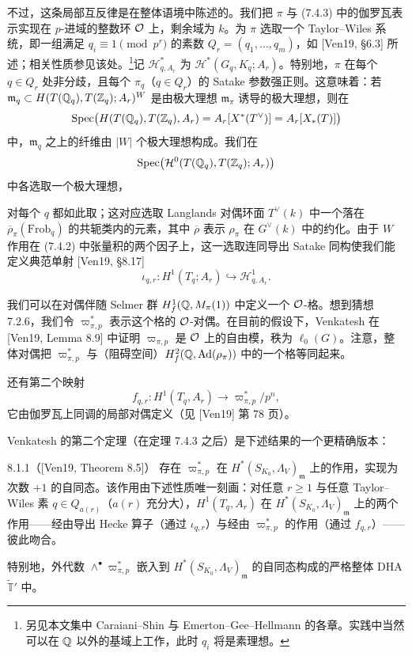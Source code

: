 不过，这条局部互反律是在整体语境中陈述的。我们把 $\pi$ 与 (7.4.3) 中的伽罗瓦表示实现在 $p$-进域的整数环 $\mathcal{O}$ 上，剩余域为 $k$。为 $\pi$ 选取一个 Taylor--Wiles 系统，即一组满足 $q_i\equiv1\pmod{p^r}$ 的素数 $Q_r=(q_1,\dots,q_m)$，如 [Ven19, §6.3] 所述；相关性质参见该处。\footnote{另见本文集中 Caraiani--Shin 与 Emerton--Gee--Hellmann 的各章。实践中当然可以在 $\mathbb{Q}$ 以外的基域上工作，此时 $q_i$ 将是素理想。}记 $\mathcal H^*_{q,A_r}$ 为 $\mathcal H^*(G_q,K_q;A_r)$。特别地，$\pi$ 在每个 $q\in Q_r$ 处非分歧，且每个 $\pi_q$（$q\in Q_r$）的 Satake 参数强正则。这意味着：若 $\mathfrak m_q\subset H(T(\mathbb{Q}_q),T(\mathbb{Z}_q);A_r)^W$ 是由极大理想 $\mathfrak m_\pi$ 诱导的极大理想，则在
\[
\operatorname{Spec}\bigl(H(T(\mathbb{Q}_q),T(\mathbb{Z}_q),A_r)=A_r[X^*(T^\vee)]=A_r[X_*(T)]\bigr)
\]
中，$\mathfrak m_q$ 之上的纤维由 $|W|$ 个极大理想构成。我们在
\[
\operatorname{Spec}\bigl(\mathcal H^0(T(\mathbb{Q}_q),T(\mathbb{Z}_q);A_r)\bigr)
\]
中各选取一个极大理想，

对每个 $q$ 都如此取；这对应选取 Langlands 对偶环面 $T^\vee(k)$ 中一个落在 $\overline{\rho}_\pi(\mathrm{Frob}_q)$ 的共轭类内的元素，其中 $\overline{\rho}$ 表示 $\rho_\pi$ 在 $G^\vee(k)$ 中的约化。由于 $W$ 作用在 (7.4.2) 中张量积的两个因子上，这一选取连同导出 Satake 同构使我们能定义典范单射 [Ven19, §8.17]
\begin{equation}\tag{8.1.1}\label{eq:a6-05-7}
\iota_{q,r}:H^1(T_q;A_r)\hookrightarrow\mathcal H^1_{q,A_r}.
\end{equation}

我们可以在对偶伴随 Selmer 群 $H^1_f(\mathbb{Q},M_\pi(1))$ 中定义一个 $\mathcal{O}$-格。想到猜想 7.2.6，我们令 $\varpi^*_{\pi,p}$ 表示这个格的 $\mathcal{O}$-对偶。在目前的假设下，Venkatesh 在 [Ven19, Lemma 8.9] 中证明 $\varpi_{\pi,p}$ 是 $\mathcal{O}$ 上的自由模，秩为 $\ell_0(G)$。注意，整体对偶把 $\varpi^*_{\pi,p}$ 与（阻碍空间）$H^2_f(\mathbb{Q},\mathrm{Ad}(\rho_\pi))$ 中的一个格等同起来。

还有第二个映射
\begin{equation}\tag{8.1.2}\label{eq:a6-05-8}
f_{q,r}:H^1(T_q,A_r)\to\varpi^*_{\pi,p}/p^n,
\end{equation}
它由伽罗瓦上同调的局部对偶定义（见 [Ven19] 第 78 页）。

Venkatesh 的第二个定理（在定理 7.4.3 之后）是下述结果的一个更精确版本：

\begin{thm}{8.1.1}（[Ven19, Theorem 8.5]）\label{thm:a6-05-9}
存在 $\varpi^*_{\pi,p}$ 在 $H^*(S_{K_0},\Lambda_V)_{\mathfrak m}$ 上的作用，实现为次数 $+1$ 的自同态。该作用由下述性质唯一刻画：对任意 $r\ge1$ 与任意 Taylor--Wiles 素 $q\in Q_{a(r)}$（$a(r)$ 充分大），$H^1(T_q,A_r)$ 在 $H^*(S_{K_0},\Lambda_V)_{\mathfrak m}$ 上的两个作用——经由导出 Hecke 算子（通过 $\iota_{q,r}$）与经由 $\varpi^*_{\pi,p}$ 的作用（通过 $f_{q,r}$）——彼此吻合。

特别地，外代数 $\wedge^\bullet\varpi^*_{\pi,p}$ 嵌入到 $H^*(S_{K_0},\Lambda_V)_{\mathfrak m}$ 的自同态构成的严格整体 DHA $\widetilde{\mathbb T}'$ 中。
\end{thm}

